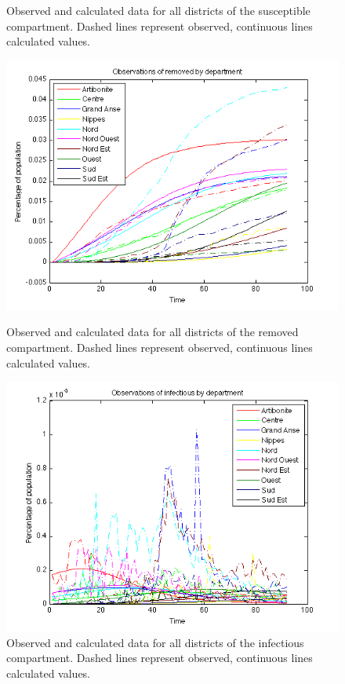 \documentclass[11pt]{article}
\begin{document}
\begin{figure}
\begin{minipage}[t]{0.49\textwidth}
    \caption{Observed and calculated data for all districts of the susceptible compartment. Dashed lines represent observed, continuous lines calculated values.}
	\label{fig:all_susceptible}
  \end{minipage}
  
  \hspace{0.15\textwidth}

  \begin{minipage}[t]{0.49\textwidth}
    \centering
    \includegraphics[width=\textwidth]{Bilder/removed.png} 
    \caption{Observed and calculated data for all districts of the removed compartment. Dashed lines represent observed, continuous lines calculated values.}
	\label{fig:all_removed}
  \end{minipage}
  \hspace{0.02\textwidth}
  \begin{minipage}[t]{0.49\textwidth}
    \centering
    \includegraphics[width=\textwidth]{Bilder/infectious.png} 
    \caption{Observed and calculated data for all districts of the infectious compartment. Dashed lines represent observed, continuous lines calculated values.}
	\label{fig:all_infectious}
  \end{minipage}
\end{figure}
\end{document}
